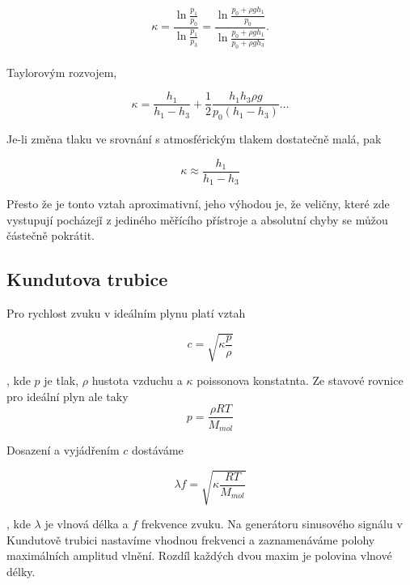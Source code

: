 \documentclass[a4paper,11pt]{article}
\begin{document}
\begin{equation}
  \kappa = \frac{\ln{\frac{p_1}{p_0}}}{\ln{\frac{p_1}{p_3}}} = \frac{\ln{\frac{p_0 + \rho g h_1}{p_0}}}{\ln{\frac{p_0 + \rho g h_1}{p_0 + \rho g h_3}}}.
\end{equation} \\

Taylorovým rozvojem,

\begin{equation}
  \kappa = \frac{h_1}{h_1 - h_3} + \frac{1}{2} \frac{h_1 h_3 \rho g}{p_0 (h_1 - h_3)} \ldots
\end{equation}

Je-li změna tlaku ve srovnání s atmosférickým tlakem dostatečně malá, pak

\begin{equation}
\kappa \approx \frac{h_1}{h_1 - h_3}
\end{equation}

Přesto že je tonto vztah aproximativní,
jeho výhodou je, že veličny, které zde vystupují pocházejǐ z jediného měřícího přístroje a absolutní chyby se můžou částečně pokrátit.

\subsection{Kundutova trubice}

Pro rychlost zvuku v ideálním plynu platí vztah

\begin{equation}
c = \sqrt{\kappa \frac{p}{\rho}} 
\end{equation}

, kde $p$ je tlak, $\rho$ hustota vzduchu a  $\kappa$ poissonova konstatnta. Ze stavové rovnice pro ideální plyn ale taky
\begin{equation}
  p = \frac{\rho R T}{ M_{mol}}
\end{equation}

Dosazení a vyjádřením $c$ dostáváme

 \begin{equation}
   \lambda f = \sqrt{\kappa \frac{RT}{M_{mol}}} 
\end{equation}

, kde $\lambda$ je vlnová délka a $f$ frekvence zvuku. 
Na generátoru sinusového signálu v Kundutově trubici nastavíme vhodnou frekvenci a zaznamenáváme polohy maximálních amplitud vlnění.
Rozdíl každých dvou maxim je polovina vlnové délky.

\newpage
\end{document}
